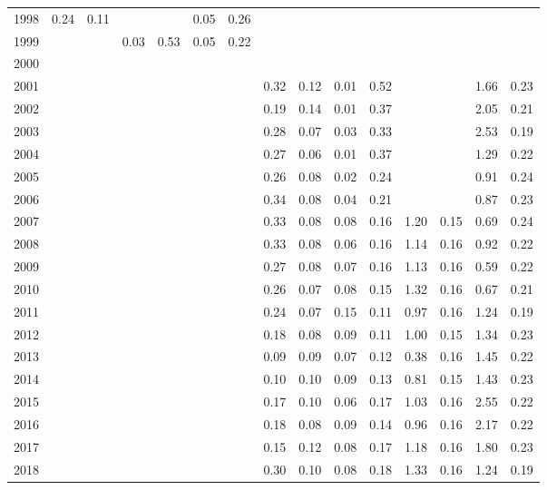 \documentclass[12pt,]{article}
\begin{document}
\begin{table}[ht]
{\begin{tabular}{rrrrrrrrrrrrrrr}
  1998 & 0.24 & 0.11 &  &  & 0.05 & 0.26 &  &  &  &  &  &  &  &  \\ 
  1999 &  &  & 0.03 & 0.53 & 0.05 & 0.22 &  &  &  &  &  &  &  &  \\ 
  2000 &  &  &  &  &  &  &  &  &  &  &  &  &  &  \\ 
  2001 &  &  &  &  &  &  & 0.32 & 0.12 & 0.01 & 0.52 &  &  & 1.66 & 0.23 \\ 
  2002 &  &  &  &  &  &  & 0.19 & 0.14 & 0.01 & 0.37 &  &  & 2.05 & 0.21 \\ 
  2003 &  &  &  &  &  &  & 0.28 & 0.07 & 0.03 & 0.33 &  &  & 2.53 & 0.19 \\ 
  2004 &  &  &  &  &  &  & 0.27 & 0.06 & 0.01 & 0.37 &  &  & 1.29 & 0.22 \\ 
  2005 &  &  &  &  &  &  & 0.26 & 0.08 & 0.02 & 0.24 &  &  & 0.91 & 0.24 \\ 
  2006 &  &  &  &  &  &  & 0.34 & 0.08 & 0.04 & 0.21 &  &  & 0.87 & 0.23 \\ 
  2007 &  &  &  &  &  &  & 0.33 & 0.08 & 0.08 & 0.16 & 1.20 & 0.15 & 0.69 & 0.24 \\ 
  2008 &  &  &  &  &  &  & 0.33 & 0.08 & 0.06 & 0.16 & 1.14 & 0.16 & 0.92 & 0.22 \\ 
  2009 &  &  &  &  &  &  & 0.27 & 0.08 & 0.07 & 0.16 & 1.13 & 0.16 & 0.59 & 0.22 \\ 
  2010 &  &  &  &  &  &  & 0.26 & 0.07 & 0.08 & 0.15 & 1.32 & 0.16 & 0.67 & 0.21 \\ 
  2011 &  &  &  &  &  &  & 0.24 & 0.07 & 0.15 & 0.11 & 0.97 & 0.16 & 1.24 & 0.19 \\ 
  2012 &  &  &  &  &  &  & 0.18 & 0.08 & 0.09 & 0.11 & 1.00 & 0.15 & 1.34 & 0.23 \\ 
  2013 &  &  &  &  &  &  & 0.09 & 0.09 & 0.07 & 0.12 & 0.38 & 0.16 & 1.45 & 0.22 \\ 
  2014 &  &  &  &  &  &  & 0.10 & 0.10 & 0.09 & 0.13 & 0.81 & 0.15 & 1.43 & 0.23 \\ 
  2015 &  &  &  &  &  &  & 0.17 & 0.10 & 0.06 & 0.17 & 1.03 & 0.16 & 2.55 & 0.22 \\ 
  2016 &  &  &  &  &  &  & 0.18 & 0.08 & 0.09 & 0.14 & 0.96 & 0.16 & 2.17 & 0.22 \\ 
  2017 &  &  &  &  &  &  & 0.15 & 0.12 & 0.08 & 0.17 & 1.18 & 0.16 & 1.80 & 0.23 \\ 
  2018 &  &  &  &  &  &  & 0.30 & 0.10 & 0.08 & 0.18 & 1.33 & 0.16 & 1.24 & 0.19 \\ 
   \hline
  \end{tabular}
}
\end{table}
\end{document}
